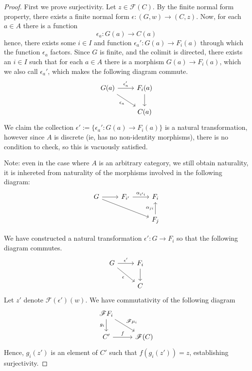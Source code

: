 \documentclass[12pt]{article}
\theoremstyle{plain}
\theoremstyle{definition}
\newcommand{\scr}[1]{\mathscr{#1}}
\newcommand{\lto}{\longrightarrow}
\begin{document}
\begin{proof}
		First we prove surjectivity. Let $z \in \scr{F}(C)$. By the finite normal form property, there exists a finite normal form $\epsilon: (G, w) \lto (C, z)$. Now, for each $a \in A$ there is a function
		\begin{equation}
			\epsilon_a: G(a) \lto C(a)
			\end{equation}
		hence, there exists some $i \in I$ and function $\epsilon_a': G(a) \lto F_i(a)$ through which the function $\epsilon_a$ factors. Since $G$ is finite, and the colimit is directed, there exists an $i \in I$ such that for each $a \in A$ there is a morphism $G(a) \lto F_i(a)$, which we also call $\epsilon_a'$, which makes the following diagram commute.
		\begin{equation}
			\begin{tikzcd}
				G(a)\arrow[r,"{\epsilon_a'}"]\arrow[dr,swap,"{\epsilon_a}"] & F_i(a)\arrow[d]\\
				& C(a)
				\end{tikzcd}
			\end{equation}
		We claim the collection $\epsilon' := \{\epsilon_a': G(a) \lto F_i(a)\}$ is a natural transformation, however since $A$ is discrete (ie, has no non-identity morphisms), there is no condition to check, so this is vacuously satisfied.
		
		Note: even in the case where $A$ is an arbitrary category, we still obtain naturality, it is inhereted from naturality of the morphisms involved in the following diagram:
		\begin{equation}
			\begin{tikzcd}
				G\arrow[r]\arrow[drr] & F_{i'}\arrow[r,"{\alpha_{i'i}}"] & F_i\\
				& & F_j\arrow[u,"{\alpha_{ji}}"]
				\end{tikzcd}
			\end{equation}
		
		We have constructed a natural transformation $\epsilon': G \lto F_i$ so that the following diagram commutes.
		\begin{equation}
			\begin{tikzcd}
				G\arrow[r,"{\epsilon'}"]\arrow[dr,swap,"{\epsilon}"] & F_i\arrow[d]\\
				& C
				\end{tikzcd}
			\end{equation}
		Let $z'$ denote $\scr{F}(\epsilon')(w)$. We have commutativity of the following diagram
		\begin{equation}
			\begin{tikzcd}
				\scr{F}F_i\arrow[d,swap,"{g_i}"]\arrow[dr,"{\scr{F}\mu_i}"]\\
				C'\arrow[r,"{f}"] & \scr{F} (C)
				\end{tikzcd}
			\end{equation}
		Hence, $g_i(z')$ is an element of $C'$ such that $f(g_i(z')) = z$, establishing surjectivity.
		

\end{proof}
\end{document}
